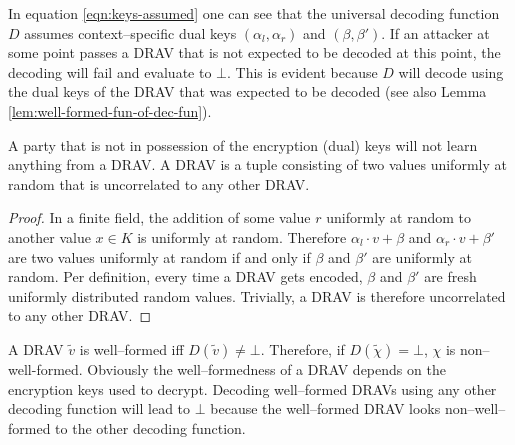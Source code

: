 \noindent{}In equation \ref{eqn:keys-assumed} one can see that the universal
decoding function $D$ assumes context--specific  dual keys $(\alpha_l,
\alpha_r)$ and $(\beta, \beta')$. If an attacker at some point passes a DRAV
that is not expected to be decoded at this point, the decoding will fail and
evaluate to $\bot$. This is evident because $D$ will decode using the dual keys
of the DRAV that was expected to be decoded (see also Lemma
\ref{lem:well-formed-fun-of-dec-fun}).

\begin{lem}
  \label{lem:DRAV-random}

  A party that is not in possession of the encryption (dual) keys will not learn
  anything from a DRAV. A DRAV is a tuple consisting of two values uniformly at
  random that is uncorrelated to any other DRAV.

\end{lem}
\begin{proof}

  In a finite field, the addition of some value $r$ uniformly at random to
  another value $x \in K$ is uniformly at random. Therefore $\alpha_l \cdot v +
  \beta$ and $\alpha_r \cdot v + \beta'$ are two values uniformly at random if
  and only if $\beta$ and $\beta'$ are uniformly at random. Per definition,
  every time a DRAV gets encoded, $\beta$ and $\beta'$ are fresh uniformly
  distributed random values. Trivially, a DRAV is therefore uncorrelated to any
  other DRAV.

\end{proof}



A DRAV $\widetilde{v}$ is well--formed iff $D(\widetilde{v}) \neq \bot$.
Therefore, if $D(\widetilde{\chi}) = \bot$, $\chi$ is non--well-formed.
Obviously the well--formedness of a DRAV depends on the encryption keys used to
decrypt. Decoding well--formed DRAVs using any other decoding function will
lead to $\bot$ because the well--formed DRAV looks non--well--formed to the
other decoding function.

